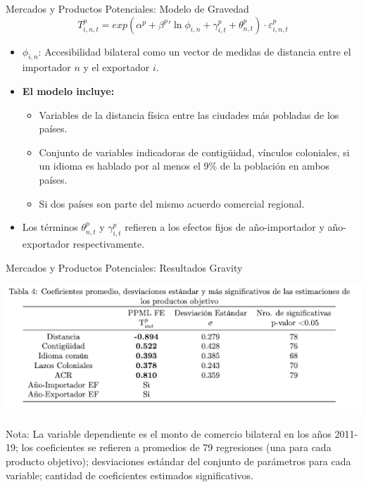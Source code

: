\documentclass{beamer}
\begin{document}
\begin{frame}{Mercados y Productos Potenciales: Modelo de Gravedad}
    \begin{equation} \tag{17}
    T^{p}_{i,n,t} = exp(\alpha^{p} + \beta^{p}'\ln \phi_{i,n} + \gamma^{p}_{i,t} + \theta^{p}_{n,t}) \cdot \varepsilon^{p}_{i,n,t}
    \end{equation}

    \begin{itemize}
        \item \( \phi_{i,n} \): Accesibilidad bilateral como un vector de medidas de distancia entre el importador \( n \) y el exportador \( i \).
           \item \textbf{El modelo incluye:}
        \begin{itemize}
            \item Variables de la distancia física entre las ciudades más pobladas de los países.
            \item Conjunto de variables indicadoras de contigüidad, vínculos coloniales, si un idioma es hablado por al menos el 9\% de la población en ambos países.
            \item Si dos países son parte del mismo acuerdo comercial regional.
        \end{itemize}
        \item Los términos \( \theta^{p}_{n,t} \) y \( \gamma^{p}_{i,t} \) refieren a los efectos fijos de año-importador y año-exportador respectivamente.
    \end{itemize}
\end{frame}


\begin{frame}{Mercados y Productos Potenciales: Resultados Gravity}
    \begin{center}
        \includegraphics[width=1.1\textwidth]{Tabla4.png}
    \end{center}
        \begin{itemize}
        \footnotesize {Nota: La variable dependiente es el monto de comercio bilateral  en los años 2011-19; los coeficientes se refieren a promedios de 79 regresiones (una para cada producto objetivo); desviaciones estándar del conjunto de parámetros para cada variable; cantidad de coeficientes estimados significativos.} 
    \end{itemize}
\end{frame}
\end{document}
